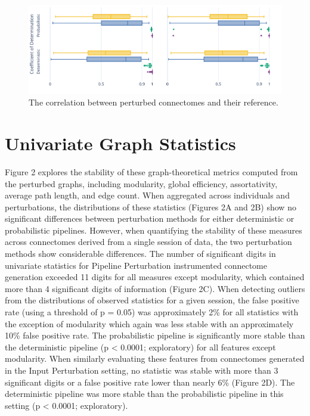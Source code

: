 \documentclass[fleqn,10pt]{SelfArx} %
\begin{document}
\begin{figure}[ht]\centering
\includegraphics[width=\linewidth]{figures/figS1_correlation_differences.pdf}
\caption{The correlation between perturbed connectomes and their reference.}
\label{fig:correlation}
\end{figure}

\clearpage
\section{Univariate Graph Statistics}
\label{supsec:univar}

Figure 2 explores the stability of these graph-theoretical metrics computed from the perturbed graphs, including
modularity, global efficiency, assortativity, average path length, and edge count. When aggregated across individuals
and perturbations, the distributions of these statistics (Figures 2A and 2B) show no significant differences between
perturbation methods for either deterministic or probabilistic pipelines. However, when quantifying the stability of
these measures across connectomes derived from a single session of data, the two perturbation methods show considerable
differences. The number of significant digits in univariate statistics for Pipeline Perturbation instrumented
connectome generation exceeded 11 digits for all measures except modularity, which contained more than 4 significant
digits of information (Figure 2C). When detecting outliers from the distributions of observed statistics for a given
session, the false positive rate (using a threshold of p = 0.05) was approximately 2\% for all statistics with the
exception of modularity which again was less stable with an approximately 10\% false positive rate. The probabilistic
pipeline is significantly more stable than the deterministic pipeline (p < 0.0001; exploratory) for all features
except modularity. When similarly evaluating these features from connectomes generated in the Input Perturbation
setting, no statistic was stable with more than 3 significant digits or a false positive rate lower than nearly 6\%
(Figure 2D). The deterministic pipeline was more stable than the probabilistic pipeline in this setting (p < 0.0001;
exploratory).
\end{document}
